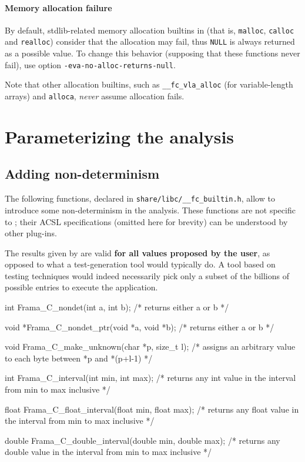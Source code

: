 \documentclass{frama-c-book}
\begin{document}
\paragraph{Memory allocation failure}

By default, stdlib-related memory allocation builtins in \Eva{}
(that is, \lstinline|malloc|, \lstinline|calloc| and \lstinline|realloc|)
consider that
the allocation may fail, thus \lstinline|NULL| is always returned as a possible
value. To change this behavior (supposing that these functions never fail),
use option \lstinline|-eva-no-alloc-returns-null|.

Note that other allocation builtins, such as \lstinline|__fc_vla_alloc|
(for variable-length arrays) and \lstinline|alloca|, {\em never} assume
allocation fails.

\section{Parameterizing the analysis}

\subsection{Adding non-determinism}
\label{nondeterminism}

The following functions, declared in \lstinline|share/libc/__fc_builtin.h|, allow to
introduce some non-determinism in the analysis.
These functions are not specific to \Eva{}; their ACSL specifications
(omitted here for brevity) can be understood by other \FramaC plug-ins.

The results given by
\Eva{} are
valid \textbf{for all values proposed by the user}, as opposed
to what a test-generation tool would typically do. A tool based
on testing techniques
would indeed necessarily pick only a subset of the billions
 of possible entries
to execute the application.

\begin{listing-nonumber}
int Frama_C_nondet(int a, int b);
    /* returns either a or b */

void *Frama_C_nondet_ptr(void *a, void *b);
    /* returns either a or b */

void Frama_C_make_unknown(char *p, size_t l);
    /* assigns an arbitrary value to each byte between *p and *(p+l-1) */

int Frama_C_interval(int min, int max);
    /* returns any int value in the interval from min to max inclusive */

float Frama_C_float_interval(float min, float max);
    /* returns any float value in the interval from min to max inclusive */

double Frama_C_double_interval(double min, double max);
    /* returns any double value in the interval from min to max inclusive */
\end{listing-nonumber}
\end{document}
